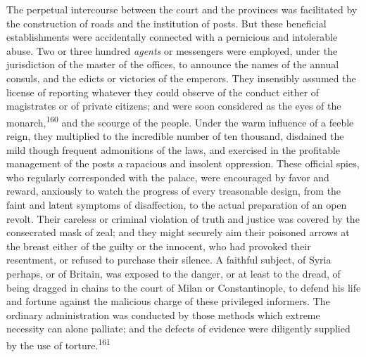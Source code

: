 The perpetual intercourse between the court and the provinces was
facilitated by the construction of roads and the institution of
posts. But these beneficial establishments were accidentally
connected with a pernicious and intolerable abuse. Two or three
hundred \textit{agents} or messengers were employed, under the
jurisdiction of the master of the offices, to announce the names
of the annual consuls, and the edicts or victories of the
emperors. They insensibly assumed the license of reporting
whatever they could observe of the conduct either of magistrates
or of private citizens; and were soon considered as the eyes of
the monarch,\textsuperscript{160} and the scourge of the people. Under the warm
influence of a feeble reign, they multiplied to the incredible
number of ten thousand, disdained the mild though frequent
admonitions of the laws, and exercised in the profitable
management of the posts a rapacious and insolent oppression.
These official spies, who regularly corresponded with the palace,
were encouraged by favor and reward, anxiously to watch the
progress of every treasonable design, from the faint and latent
symptoms of disaffection, to the actual preparation of an open
revolt. Their careless or criminal violation of truth and justice
was covered by the consecrated mask of zeal; and they might
securely aim their poisoned arrows at the breast either of the
guilty or the innocent, who had provoked their resentment, or
refused to purchase their silence. A faithful subject, of Syria
perhaps, or of Britain, was exposed to the danger, or at least to
the dread, of being dragged in chains to the court of Milan or
Constantinople, to defend his life and fortune against the
malicious charge of these privileged informers. The ordinary
administration was conducted by those methods which extreme
necessity can alone palliate; and the defects of evidence were
diligently supplied by the use of torture.\textsuperscript{161}



